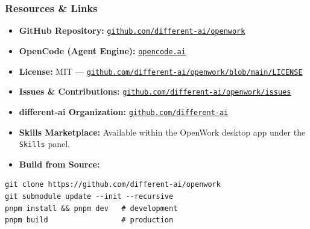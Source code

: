 \begin{frame}[fragile]\frametitle{Resources \& Links}
  \begin{itemize}
    \item \textbf{GitHub Repository:} \href{https://github.com/different-ai/openwork}{\texttt{github.com/different-ai/openwork}}
    \item \textbf{OpenCode (Agent Engine):} \href{https://opencode.ai}{\texttt{opencode.ai}}
    \item \textbf{License:} MIT — \href{https://github.com/different-ai/openwork/blob/main/LICENSE}{\texttt{github.com/different-ai/openwork/blob/main/LICENSE}}
    \item \textbf{Issues \& Contributions:} \href{https://github.com/different-ai/openwork/issues}{\texttt{github.com/different-ai/openwork/issues}}
    \item \textbf{different-ai Organization:} \href{https://github.com/different-ai}{\texttt{github.com/different-ai}}
    \item \textbf{Skills Marketplace:} Available within the OpenWork desktop app under the \texttt{Skills} panel.
    \item \textbf{Build from Source:}
  \end{itemize}
\begin{lstlisting}
git clone https://github.com/different-ai/openwork
git submodule update --init --recursive
pnpm install && pnpm dev   # development
pnpm build                 # production
\end{lstlisting}
\end{frame}